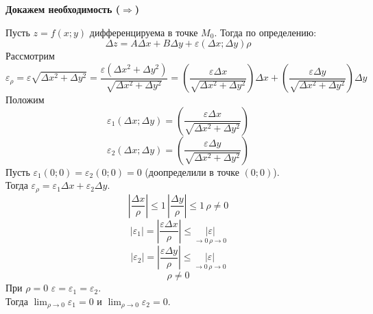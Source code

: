 \documentclass[12pt]{article}
\begin{document}
    \begin{adjustwidth}{1.5em}{1.5em}
        \textbf{Докажем необходимость ($\Rightarrow$)}\par\noindent
        Пусть $z = f(x; y)$ дифференцируема в точке $M_0$. Тогда по определению:
        \[ \Delta z = A \Delta x + B \Delta y + \varepsilon (\Delta x; \Delta y)\rho \]
        Рассмотрим 
        \[ \varepsilon_\rho = \varepsilon \sqrt{\Delta x^2 + \Delta y^2} = \frac{\varepsilon (\Delta x^2 + \Delta y^2)}{\sqrt{\Delta x^2 + \Delta y^2}} = \left( \frac{\varepsilon \Delta x}{\sqrt{\Delta x^2 + \Delta y^2}} \right)\Delta x + \left( \frac{\varepsilon \Delta y}{\sqrt{\Delta x^2 + \Delta y^2}} \right)\Delta y \]
        Положим
        \[ \varepsilon_1 (\Delta x; \Delta y) = \left( \frac{\varepsilon \Delta x}{\sqrt{\Delta x^2 + \Delta y^2}} \right) \]
        \[ \varepsilon_2 (\Delta x; \Delta y) = \left( \frac{\varepsilon \Delta y}{\sqrt{\Delta x^2 + \Delta y^2}} \right) \]
        Пусть $\varepsilon_1 (0; 0) = \varepsilon_2 (0; 0) = 0$ (доопределили в точке $(0; 0)$).\\
        Тогда $\varepsilon_\rho = \varepsilon_1 \Delta x + \varepsilon_2 \Delta y$.
        \[ \left| \frac{\Delta x}{\rho} \right| \le 1\, \left| \frac{\Delta y}{\rho} \right| \le 1\, \rho \ne 0 \]
        \[ | \varepsilon_1 | = \left| \frac{\varepsilon \Delta x}{\rho} \right| \le \underset{\to 0\, \rho \to 0}{|\varepsilon|} \]
        \[ | \varepsilon_2 | = \left| \frac{\varepsilon \Delta y}{\rho} \right| \le \underset{\to 0\, \rho \to 0}{|\varepsilon|} \]
        \[ \rho \ne 0 \]
        При $\rho = 0$ $\varepsilon = \varepsilon_1 = \varepsilon_2$.\\
        Тогда $\lim_{\rho \to 0}\varepsilon_1 = 0$ и $\lim_{\rho \to 0}\varepsilon_2 = 0$.\par\noindent


\end{adjustwidth}
\end{document}
